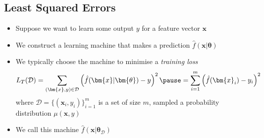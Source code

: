 
\begin{slide}
\section{Least Squared Errors}

\begin{PauseHighLight}
  \begin{itemize}
  \item Suppose we want to learn some output $y$ for a feature vector $\bm{x}$\pause
  \item We construct a learning machine that makes a prediction
    $\hat{f}(\bm{x}|\bm{\theta})$\pause
  \item We typically choose the machine to  minimise a \textit{training loss}
    \begin{align*}
      L_T(\mathcal{D}) = \sum_{(\bm{x},y)\in\mathcal{D}} \left(
      \hat{f}(\bm{x}|\bm{\theta}) - y \right)^2 \pause
      = \sum_{i=1}^m \left(
      \hat{f}(\bm{x}_i) - y_i \right)^2
    \end{align*}
    where $\mathcal{D} = \{(\bm{x}_i, y_i)\}_{i=1}^m$ is a set of
    size $m$, sampled a probability distribution $\mu(\bm{x},y)$\pauseb
  \item We call this machine $\hat{f}(\bm{x}\vert \bm{\theta}_\mathcal{D})$\pauseb
  \end{itemize}
\end{PauseHighLight}

\end{slide}


